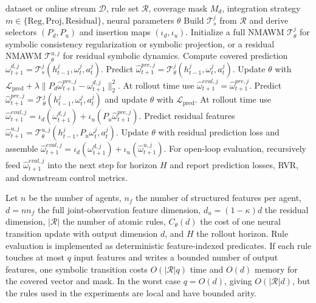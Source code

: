 \documentclass{article}
\theoremstyle{plain}
\theoremstyle{definition}
\theoremstyle{remark}
\begin{document}
\begin{algorithm}[h]
  \caption{NS-MAWM training and open-loop rollout}
  \label{alg:NS-MAWM}
  \begin{algorithmic}[1]
    \REQUIRE dataset or online stream $\mathcal{D}$, rule set $\mathcal{R}$, coverage mask $M_d$, integration strategy $m\in\{\mathrm{Reg},\mathrm{Proj},\mathrm{Residual}\}$, neural parameters $\theta$
    \STATE Build $\mathcal{T}^j_s$ from $\mathcal{R}$ and derive selectors $(P_d,P_u)$ and insertion maps $(\iota_d,\iota_u)$.
    \STATE Initialize a full NMAWM $\mathcal{T}^j_\theta$ for symbolic consistency regularization or symbolic projection, or a residual NMAWM $\mathcal{T}^{u,j}_\theta$ for residual symbolic dynamics.
    \STATE Compute covered prediction $\omega^{d,j}_{t+1}=\mathcal{T}^j_s(h^j_{t-1},\omega^j_t,a^j_t)$.
    \STATE Predict $\hat{\omega}^{pre,j}_{t+1}=\mathcal{T}^j_\theta(h^j_{t-1},\omega^j_t,a^j_t)$.
    \STATE Update $\theta$ with $\mathcal{L}_{\mathrm{pred}}+\lambda\|P_d\hat{\omega}^{pre,j}_{t+1}-\omega^{d,j}_{t+1}\|_2^2$.
    \STATE At rollout time use $\hat{\omega}^{eval,j}_{t+1}=\hat{\omega}^{pre,j}_{t+1}$.
    \STATE Predict $\hat{\omega}^{pre,j}_{t+1}=\mathcal{T}^j_\theta(h^j_{t-1},\omega^j_t,a^j_t)$ and update $\theta$ with $\mathcal{L}_{\mathrm{pred}}$.
    \STATE At rollout time use $\hat{\omega}^{eval,j}_{t+1}=\iota_d(\omega^{d,j}_{t+1})+\iota_u(P_u\hat{\omega}^{pre,j}_{t+1})$.
    \ELSE
    \STATE Predict residual features $\hat{\omega}^{u,j}_{t+1}=\mathcal{T}^{u,j}_\theta(h^j_{t-1},P_u\omega^j_t,a^j_t)$.
    \STATE Update $\theta$ with residual prediction loss and assemble $\hat{\omega}^{eval,j}_{t+1}=\iota_d(\omega^{d,j}_{t+1})+\iota_u(\hat{\omega}^{u,j}_{t+1})$.
    \ENDIF
    \ENDFOR
    \STATE For open-loop evaluation, recursively feed $\hat{\omega}^{eval,j}_{t+1}$ into the next step for horizon $H$ and report prediction losses, RVR, and downstream control metrics.
  \end{algorithmic}
\end{algorithm}

Let $n$ be the number of agents, $n_f$ the number of structured features per agent, $d=n n_f$ the full joint-observation feature dimension, $d_u=(1-\kappa)d$ the residual dimension, $|\mathcal{R}|$ the number of atomic rules, $C_\theta(d)$ the cost of one neural transition update with output dimension $d$, and $H$ the rollout horizon. Rule evaluation is implemented as deterministic feature-indexed predicates. If each rule touches at most $q$ input features and writes a bounded number of output features, one symbolic transition costs $O(|\mathcal{R}|q)$ time and $O(d)$ memory for the covered vector and mask. In the worst case $q=O(d)$, giving $O(|\mathcal{R}|d)$, but the rules used in the experiments are local and have bounded arity.
\end{document}
